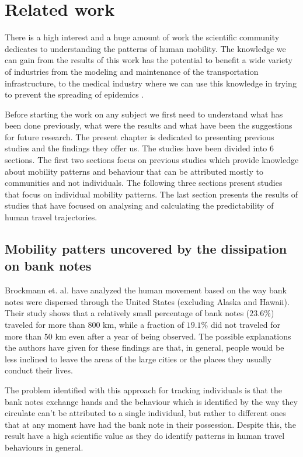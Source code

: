 \chapter{Related work}
\label{relatedwork}
There is a high interest and a huge amount of work the scientific community
dedicates to understanding the patterns of human mobility. The knowledge we can
gain from the results of this work has the potential to benefit a wide variety
of industries from the modeling and maintenance of the transportation
infrastructure, to the medical industry where we can use this knowledge in
trying to prevent the spreading of epidemics \cite{Brockmann08}.

Before starting the work on any subject we first need to understand what has
been done previously, what were the results and what have been the suggestions
for future research. The present chapter is dedicated to presenting previous
studies and the findings they offer us. The studies have been divided into $6$
sections. The first two sections focus on previous studies which provide
knowledge about mobility patterns and behaviour that can be attributed mostly to
communities and not individuals. The following three sections present studies
that focus on individual mobility patterns. The last section presents the
results of studies that have focused on analysing and calculating the
predictability of human travel trajectories.

\section{Mobility patters uncovered by the dissipation on bank notes}
Brockmann et. al.\cite{Brockmann06} have analyzed the human movement based on
the way bank notes were dispersed through the United States (excluding Alaska
and Hawaii). Their study shows that a relatively small percentage of bank notes
($23.6\%$) traveled for more than $800$ km, while a fraction of $19.1\%$ did not
traveled for more than $50$ km even after a year of being observed. The possible
explanations the authors have given for these findings are that, in general,
people would be less inclined to leave the areas of the large cities or the
places they usually conduct their lives.

The problem identified with this approach for tracking individuals is that the
bank notes exchange hands and the behaviour which is identified by the way they
circulate can't be attributed to a single individual, but rather to different
ones that at any moment have had the bank note in their possession. Despite this,
the result have a high scientific value as they do identify patterns in human
travel behaviours in general.

